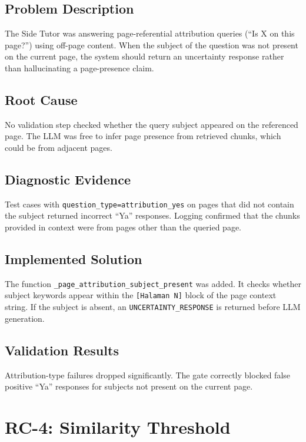 \documentclass[12pt, a4paper]{report}
\newcommand{\codeinline}[1]{\texttt{#1}}
\begin{document}
\subsection{Problem Description}

The Side Tutor was answering page-referential attribution queries
(``Is X on this page?'') using off-page content. When the subject of the
question was not present on the current page, the system should return an
uncertainty response rather than hallucinating a page-presence claim.

\subsection{Root Cause}

No validation step checked whether the query subject appeared on the referenced
page. The LLM was free to infer page presence from retrieved chunks, which
could be from adjacent pages.

\subsection{Diagnostic Evidence}

Test cases with \codeinline{question\_type=attribution\_yes} on pages that did
not contain the subject returned incorrect ``Ya'' responses. Logging confirmed
that the chunks provided in context were from pages other than the queried page.

\subsection{Implemented Solution}

The function \codeinline{\_page\_attribution\_subject\_present} was added. It
checks whether subject keywords appear within the \codeinline{[Halaman N]} block
of the page context string. If the subject is absent, an
\codeinline{UNCERTAINTY\_RESPONSE} is returned before LLM generation.

\subsection{Validation Results}

Attribution-type failures dropped significantly. The gate correctly blocked
false positive ``Ya'' responses for subjects not present on the current page.

\section{RC-4: Similarity Threshold}
\label{sec:rc4}
\end{document}
